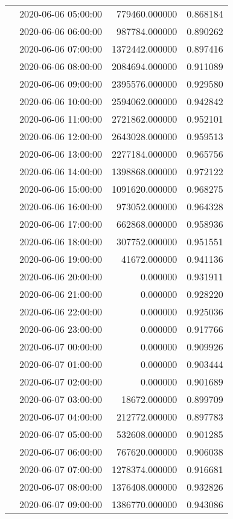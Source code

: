 \begin{tabular}{llrr}
 & 2020-06-06 05:00:00 & 779460.000000 & 0.868184 \\
 & 2020-06-06 06:00:00 & 987784.000000 & 0.890262 \\
 & 2020-06-06 07:00:00 & 1372442.000000 & 0.897416 \\
 & 2020-06-06 08:00:00 & 2084694.000000 & 0.911089 \\
 & 2020-06-06 09:00:00 & 2395576.000000 & 0.929580 \\
 & 2020-06-06 10:00:00 & 2594062.000000 & 0.942842 \\
 & 2020-06-06 11:00:00 & 2721862.000000 & 0.952101 \\
 & 2020-06-06 12:00:00 & 2643028.000000 & 0.959513 \\
 & 2020-06-06 13:00:00 & 2277184.000000 & 0.965756 \\
 & 2020-06-06 14:00:00 & 1398868.000000 & 0.972122 \\
 & 2020-06-06 15:00:00 & 1091620.000000 & 0.968275 \\
 & 2020-06-06 16:00:00 & 973052.000000 & 0.964328 \\
 & 2020-06-06 17:00:00 & 662868.000000 & 0.958936 \\
 & 2020-06-06 18:00:00 & 307752.000000 & 0.951551 \\
 & 2020-06-06 19:00:00 & 41672.000000 & 0.941136 \\
 & 2020-06-06 20:00:00 & 0.000000 & 0.931911 \\
 & 2020-06-06 21:00:00 & 0.000000 & 0.928220 \\
 & 2020-06-06 22:00:00 & 0.000000 & 0.925036 \\
 & 2020-06-06 23:00:00 & 0.000000 & 0.917766 \\
 & 2020-06-07 00:00:00 & 0.000000 & 0.909926 \\
 & 2020-06-07 01:00:00 & 0.000000 & 0.903444 \\
 & 2020-06-07 02:00:00 & 0.000000 & 0.901689 \\
 & 2020-06-07 03:00:00 & 18672.000000 & 0.899709 \\
 & 2020-06-07 04:00:00 & 212772.000000 & 0.897783 \\
 & 2020-06-07 05:00:00 & 532608.000000 & 0.901285 \\
 & 2020-06-07 06:00:00 & 767620.000000 & 0.906038 \\
 & 2020-06-07 07:00:00 & 1278374.000000 & 0.916681 \\
 & 2020-06-07 08:00:00 & 1376408.000000 & 0.932826 \\
 & 2020-06-07 09:00:00 & 1386770.000000 & 0.943086 \\

\end{tabular}

